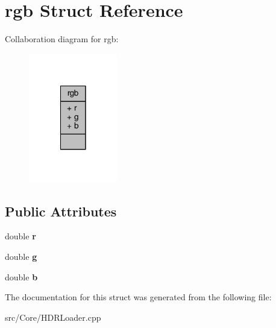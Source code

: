 \hypertarget{structrgb}{\section{rgb Struct Reference}
\label{structrgb}
}


Collaboration diagram for rgb\-:
\nopagebreak
\begin{figure}[H]
\begin{center}
\leavevmode
\includegraphics[width=110pt]{structrgb__coll__graph}
\end{center}
\end{figure}
\subsection*{Public Attributes}
\begin{DoxyCompactItemize}
\item 
\hypertarget{structrgb_ad5a38e43f70fb57d6da052745ea5ff90}{double {\bfseries r}}\label{structrgb_ad5a38e43f70fb57d6da052745ea5ff90}

\item 
\hypertarget{structrgb_a1c51cad47a05c797643776f9357a8749}{double {\bfseries g}}\label{structrgb_a1c51cad47a05c797643776f9357a8749}

\item 
\hypertarget{structrgb_aa3e45a2c26ad435fe29dfea49f16831e}{double {\bfseries b}}\label{structrgb_aa3e45a2c26ad435fe29dfea49f16831e}

\end{DoxyCompactItemize}


The documentation for this struct was generated from the following file\-:\begin{DoxyCompactItemize}
\item 
src/\-Core/H\-D\-R\-Loader.\-cpp\end{DoxyCompactItemize}

